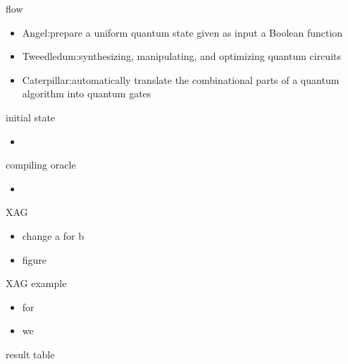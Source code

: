 \documentclass[aspectratio=1610]{beamer}
\begin{document}
\begin{frame}{flow}
  \begin{itemize}
    \item Angel:prepare a uniform quantum state
    given as input a Boolean function
    \item Tweedledum:synthesizing,
    manipulating, and optimizing quantum circuits
    \item Caterpillar:automatically translate the combinational parts of a quantum
    algorithm into quantum gates
  \end{itemize}
\end{frame}
\begin{frame}{initial state}
  \begin{itemize}
    \item 
  \end{itemize}
\end{frame}
\begin{frame}{compiling oracle}
  \begin{itemize}
    \item 
  \end{itemize}
\end{frame}
\begin{frame}{XAG}
  \begin{itemize}
    \item change a for b
    \item figure
  \end{itemize}
\end{frame}
\begin{frame}{XAG example}
  \begin{itemize}
    \item for
    \item we 
  \end{itemize}
\end{frame}
\begin{frame}{result}
  table   
\end{frame}
\end{document}
